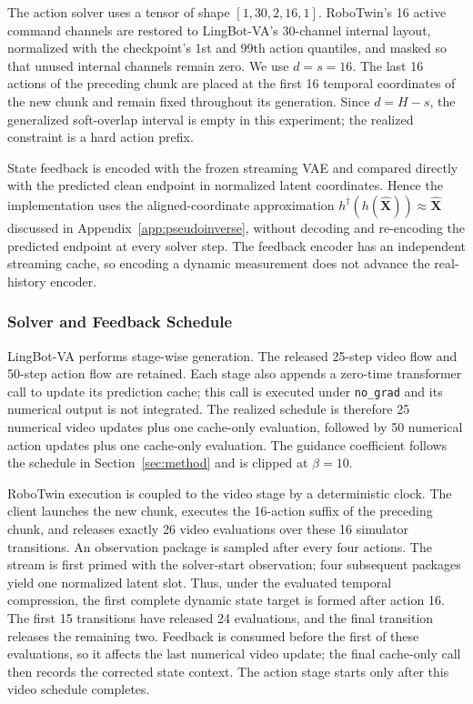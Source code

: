 The action solver uses a tensor of shape $[1,30,2,16,1]$. RoboTwin's 16 active
command channels are restored to LingBot-VA's 30-channel internal layout,
normalized with the checkpoint's 1st and 99th action quantiles, and masked so
that unused internal channels remain zero. We use $d=s=16$. The last 16 actions
of the preceding chunk are placed at the first 16 temporal coordinates of the
new chunk and remain fixed throughout its generation. Since $d=H-s$, the
generalized soft-overlap interval is empty in this experiment; the realized
constraint is a hard action prefix.

State feedback is encoded with the frozen streaming VAE and compared directly
with the predicted clean endpoint in normalized latent coordinates. Hence the
implementation uses the aligned-coordinate approximation
$h^\dagger(h(\hat{\mathbf X}))\approx\hat{\mathbf X}$ discussed in
Appendix~\ref{app:pseudoinverse}, without decoding and re-encoding the predicted
endpoint at every solver step. The feedback encoder has an independent
streaming cache, so encoding a dynamic measurement does not advance the
real-history encoder.

\subsubsection{Solver and Feedback Schedule}

LingBot-VA performs stage-wise generation. The released 25-step video flow and
50-step action flow are retained. Each stage also appends a zero-time
transformer call to update its prediction cache; this call is executed under
\texttt{no\_grad} and its numerical output is not integrated. The realized
schedule is therefore 25 numerical video updates plus one cache-only
evaluation, followed by 50 numerical action updates plus one cache-only
evaluation. The guidance coefficient follows the schedule in
Section~\ref{sec:method} and is clipped at $\beta=10$.

RoboTwin execution is coupled to the video stage by a deterministic clock. The
client launches the new chunk, executes the 16-action suffix of the preceding
chunk, and releases exactly 26 video evaluations over these 16 simulator
transitions. An observation package is sampled after every four actions. The
stream is first primed with the solver-start observation; four subsequent
packages yield one normalized latent slot. Thus, under the evaluated temporal
compression, the first complete dynamic state target is formed after action
16. The first 15 transitions have released 24 evaluations, and the final
transition releases the remaining two. Feedback is consumed before the first
of these evaluations, so it affects the last numerical video update; the final
cache-only call then records the corrected state context. The action stage
starts only after this video schedule completes.


